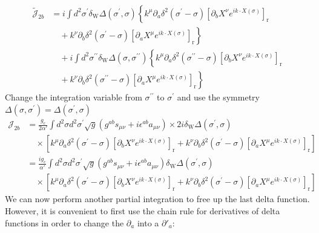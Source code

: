 \begin{tcolorbox}[breakable]
\begin{align}
			\tilde{\mathcal{J}}_{2 b} &= i \int d^2 \sigma^{\prime} \delta_{\mathrm{W}} \Delta\left(\sigma^{\prime}, \sigma\right)\left\{k^\mu \partial_a \delta^2\left(\sigma^{\prime}-\sigma\right)\left[\partial_b X^\nu e^{i k \cdot X(\sigma)}\right]_{\mathrm{r}}\right. \nonumber \\
			&\quad + \left.k^\nu \partial_b \delta^2\left(\sigma^{\prime}-\sigma\right)\left[\partial_a X^\mu e^{i k \cdot X(\sigma)}\right]_{\mathrm{r}}\right\} \nonumber \\
			&\quad + i \int d^2 \sigma^{\prime \prime} \delta_{\mathrm{W}} \Delta\left(\sigma, \sigma^{\prime \prime}\right)\left\{k^\mu \partial_a \delta^2\left(\sigma^{\prime \prime}-\sigma\right)\left[\partial_b X^\nu e^{i k \cdot X(\sigma)}\right]_{\mathrm{r}}\right. \nonumber \\
			&\quad + \left.k^\nu \partial_b \delta^2\left(\sigma^{\prime \prime}-\sigma\right)\left[\partial_a X^\mu e^{i k \cdot X(\sigma)}\right]_{\mathrm{r}}\right\}
		\end{align}
		Change the integration variable from $\sigma^{\prime \prime}$ to $\sigma^{\prime}$ and use the symmetry $\Delta\left(\sigma, \sigma^{\prime}\right)=\Delta\left(\sigma^{\prime}, \sigma\right)$
		\begin{align}
			\mathcal{J}_{2 b} &= \frac{g_c}{2 \alpha'} \int d^2 \sigma d^2 \sigma^{\prime} \sqrt{g}\left(g^{a b} s_{\mu \nu}+i \epsilon^{a b} a_{\mu \nu}\right) \times 2 i \delta_{\mathrm{W}} \Delta\left(\sigma^{\prime}, \sigma\right) \nonumber \\
			&\quad \times\left[k^\mu \partial_a \delta^2\left(\sigma^{\prime}-\sigma\right)\left[\partial_b X^\nu e^{i k \cdot X(\sigma)}\right]_{\mathrm{r}} + k^\nu \partial_b \delta^2\left(\sigma^{\prime}-\sigma\right)\left[\partial_a X^\mu e^{i k \cdot X(\sigma)}\right]_{\mathrm{r}}\right] \nonumber \\
			&= \frac{i g_c}{\alpha'} \int d^2 \sigma d^2 \sigma^{\prime} \sqrt{g}\left(g^{a b} s_{\mu \nu}+i \epsilon^{a b} a_{\mu \nu}\right) \delta_{\mathrm{W}} \Delta\left(\sigma^{\prime}, \sigma\right) \nonumber \\
			&\quad \times\left[k^\mu \partial_a \delta^2\left(\sigma^{\prime}-\sigma\right)\left[\partial_b X^\nu e^{i k \cdot X(\sigma)}\right]_{\mathrm{r}} + k^\nu \partial_b \delta^2\left(\sigma^{\prime}-\sigma\right)\left[\partial_a X^\mu e^{i k \cdot X(\sigma)}\right]_{\mathrm{r}}\right]
		\end{align}
		We can now perform another partial integration to free up the last delta function. However, it is convenient to first use the chain rule for derivatives of delta functions in order to change the $\partial_a$ into a $\partial'_a$:

\end{tcolorbox}
